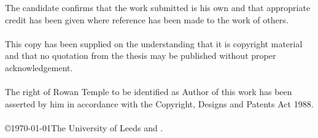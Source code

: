
\begin{ipstatement} %

The candidate confirms that the work submitted is his own and that
appropriate credit has been given where reference has been made to
the work of others.
\\
\\
This copy has been supplied on the understanding that it is copyright
material and that no quotation from the thesis may be published
without proper acknowledgement.
\\
\\
The right of Rowan Temple to be identified as Author of this work
has been asserted by him in accordance with the Copyright, Designs
and Patents Act 1988.
\\
\\
\copyright \yeardate\today The University of Leeds and \theAuthor.

\end{ipstatement}


